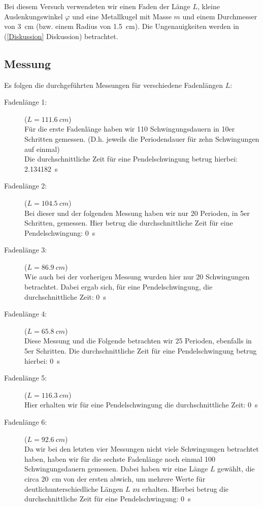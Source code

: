 \documentclass[11pt,a4paper,titlepage, ngerman]{article}
\begin{document}
			Bei diesem Versuch verwendeten wir einen Faden der Länge $L$, kleine Auslenkungswinkel $\varphi$ und eine Metallkugel mit Masse $m$ und einem Durchmesser von \SI{3}{cm} (bzw. einem Radius von \SI{1,5}{cm}). Die Ungenauigkeiten werden in (\ref{Diskussion} Diskussion) betrachtet.
			\vspace{0.25cm}
		
		\subsection{Messung}
		\label{Messung}
			Es folgen die durchgeführten Messungen für verschiedene Fadenlängen $L$: 
			\vspace{0.25cm} 
			
			\begin{description}
				
				\item[Fadenlänge 1:]($L = \SI{111,6}{cm}$)\\ 				
				Für die erste Fadenlänge haben wir 110 Schwingungsdauern in 10er Schritten gemessen. (D.h. jeweils die Periodendauer für zehn Schwingungen auf einmal) \\
				Die durchschnittliche Zeit für eine Pendelschwingung betrug hierbei: \SI{2.134182}{s}
				
				\item[Fadenlänge 2:]($L = \SI{104,5}{cm}$)\\ 				 
				Bei dieser und der folgenden Messung haben wir nur 20 Perioden, in 5er Schritten, gemessen. Hier betrug die durchschnittliche Zeit für eine Pendelschwingung: \SI{0}{s}
				
				\item[Fadenlänge 3:]($L = \SI{86,9}{cm}$)\\ 			
				Wie auch bei der vorherigen Messung wurden hier nur 20 Schwingungen betrachtet. Dabei ergab sich, für eine Pendelschwingung, die durchschnittliche Zeit: \SI{0}{s}		
				
				\item[Fadenlänge 4:]($L = \SI{65,8}{cm}$)\\ 				
				Diese Messung und die Folgende betrachten wir 25 Perioden, ebenfalls in 5er Schritten. Die durchschnittliche Zeit für eine Pendelschwingung betrug hierbei: \SI{0}{s}
				
				\item[Fadenlänge 5:]($L = \SI{116,3}{cm}$)\\ 				
				Hier erhalten wir für eine Pendelschwingung die durchschnittliche Zeit: \SI{0}{s}
				
				\item[Fadenlänge 6:]($L = \SI{92,6}{cm}$)\\ 				
				Da wir bei den letzten vier Messungen nicht viele Schwingungen betrachtet haben, haben wir für die sechste Fadenlänge noch einmal 100 Schwingungsdauern gemessen. Dabei haben wir eine Länge $L$ gewählt, die circa \SI{20}{cm} von der ersten abwich, um mehrere Werte für \glqq deutlich\grqq unterschiedliche Längen $L$ zu erhalten. 
				Hierbei betrug die durchschnittliche Zeit für eine Pendelschwingung: \SI{0}{s}
				
			\end{description}
		
\end{document}
